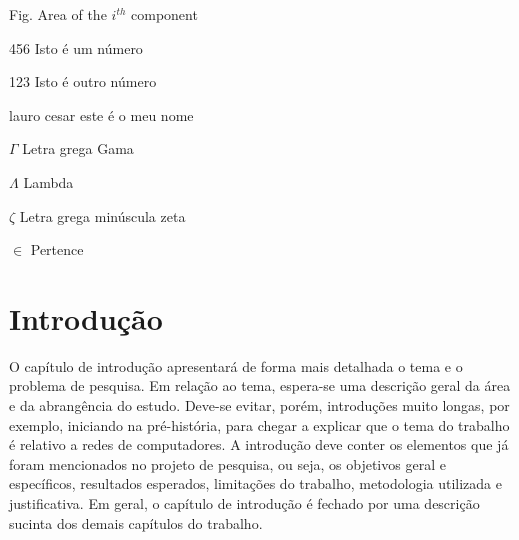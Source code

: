 \documentclass[
	12pt,				%
    oneside,			%
	a4paper,			%
	english,			%
	french,				%
	spanish,			%
	brazil,				%
	]{abntex2}
\begin{document}

\listoffigures* %
\cleardoublepage %


\listoftables*
\cleardoublepage

\begin{siglas}
  \item[Fig.] Area of the $i^{th}$ component
  \item[456] Isto é um número
  \item[123] Isto é outro número
  \item[lauro cesar] este é o meu nome
\end{siglas}

\begin{simbolos}
  \item[$ \Gamma $] Letra grega Gama
  \item[$ \Lambda $] Lambda
  \item[$ \zeta $] Letra grega minúscula zeta
  \item[$ \in $] Pertence
\end{simbolos}


\tableofcontents*


\textual


\chapter{Introdução} %



O capítulo de introdução apresentará de forma mais detalhada o tema e o problema de pesquisa. Em relação ao
tema, espera-se uma descrição geral da área e da abrangência do estudo. Deve-se evitar, porém, introduções
muito longas, por exemplo, iniciando na pré-história, para chegar a explicar que o tema do trabalho é relativo a
redes de computadores.
A introdução deve conter os elementos que já foram mencionados no projeto de pesquisa, ou seja, os
objetivos geral e específicos, resultados esperados, limitações do trabalho, metodologia utilizada e justificativa.
Em geral, o capítulo de introdução é fechado por uma descrição sucinta dos demais capítulos do trabalho.
\end{document}
